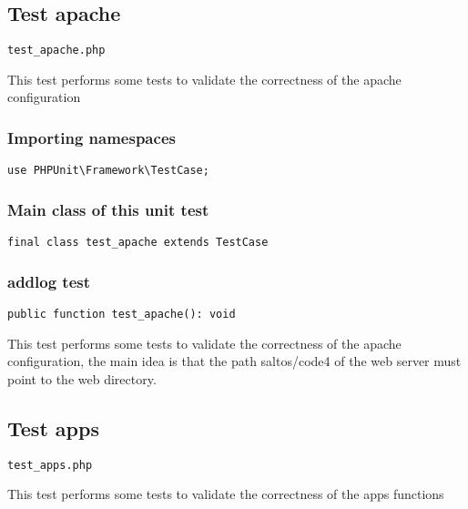 \documentclass[a4paper]{article}
\begin{document}
\hypertarget{toc25}{}
\subsection{Test apache}

\begin{lstlisting}
test_apache.php
\end{lstlisting}

This test performs some tests to validate the correctness
of the apache configuration

\hypertarget{toc26}{}
\subsubsection{Importing namespaces}

\begin{lstlisting}
use PHPUnit\Framework\TestCase;
\end{lstlisting}

\hypertarget{toc27}{}
\subsubsection{Main class of this unit test}

\begin{lstlisting}
final class test_apache extends TestCase
\end{lstlisting}

\hypertarget{toc28}{}
\subsubsection{addlog test}

\begin{lstlisting}
public function test_apache(): void
\end{lstlisting}

This test performs some tests to validate the correctness of the apache configuration,
the main idea is that the path saltos/code4 of the web server must point to the web
directory.

\hypertarget{toc29}{}
\subsection{Test apps}

\begin{lstlisting}
test_apps.php
\end{lstlisting}

This test performs some tests to validate the correctness
of the apps functions
\end{document}

